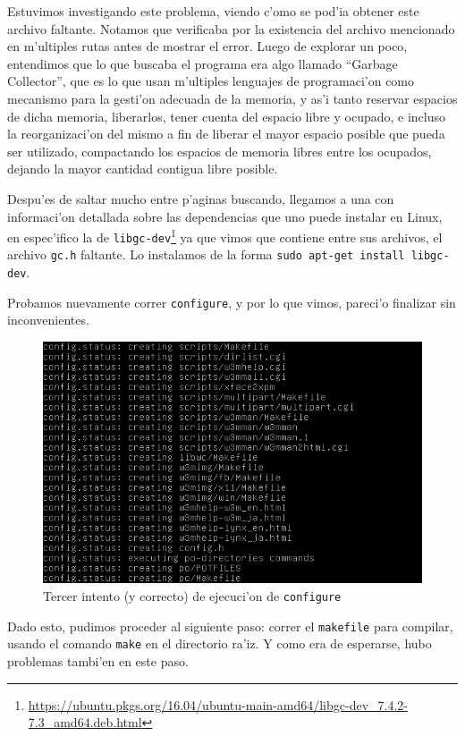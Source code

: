 \documentclass[11pt]{article}
\begin{document}
		Estuvimos investigando este problema, viendo c'omo se pod'ia obtener este archivo faltante. Notamos que verificaba por la existencia del archivo mencionado en m'ultiples rutas antes de mostrar el error. Luego de explorar un poco, entendimos que lo que buscaba el programa era algo llamado ``Garbage Collector'', que es lo que usan m'ultiples lenguajes de programaci'on como mecanismo para la gesti'on adecuada de la memoria, y as'i tanto reservar espacios de dicha memoria, liberarlos, tener cuenta del espacio libre y ocupado, e incluso la reorganizaci'on del mismo a fin de liberar el mayor espacio posible que pueda ser utilizado, compactando los espacios de memoria libres entre los ocupados, dejando la mayor cantidad contigua libre posible. 
		
		Despu'es de saltar mucho entre p'aginas buscando, llegamos a una con informaci'on detallada sobre las dependencias que uno puede instalar en Linux, en espec'ifico la de \texttt{libgc-dev}\footnote{\url{https://ubuntu.pkgs.org/16.04/ubuntu-main-amd64/libgc-dev_7.4.2-7.3_amd64.deb.html}} ya que vimos que contiene entre sus archivos, el archivo \texttt{gc.h} faltante. Lo instalamos de la forma \texttt{sudo apt-get install libgc-dev}.
		
		Probamos nuevamente correr \texttt{configure}, y por lo que vimos, pareci'o finalizar sin inconvenientes.
		
		\begin{figure}[H]
			\centering \captionsetup{justification=centering}
			\includegraphics[width=.8\linewidth]{Images/Compile_w3m/configure_successful}
			\caption{Tercer intento (y correcto) de ejecuci'on de \texttt{configure}}
			\label{fig:configure_successful}
		\end{figure}
		
		Dado esto, pudimos proceder al siguiente paso: correr el \texttt{makefile} para compilar, usando el comando \texttt{make} en el directorio ra'iz. Y como era de esperarse, hubo problemas tambi'en en este paso.
		
\end{document}
